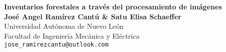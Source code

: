 \documentclass[a0,portrait]{a0poster}
\begin{document}


\begin{minipage}[b]{1\linewidth}
\centering \veryHuge \color{Black} \textbf{Inventarios forestales a través del procesamiento de imágenes}\\ %
\huge \textbf{José Angel Ramírez Cantú \& Satu Elisa Schaeffer}\\[0.5cm] %
\huge Universidad Autónoma de Nuevo León\\[0.4cm] %
\huge Facultad de Ingeniería Mecánica y Eléctrica\\[0.4cm] %
\Large \texttt{jose\_ramirezcantu@outlook.com}\\
\end{minipage}
%
\begin{minipage}[b]{0.25\linewidth}
\end{minipage}

\vspace{1cm} %

\end{document}
